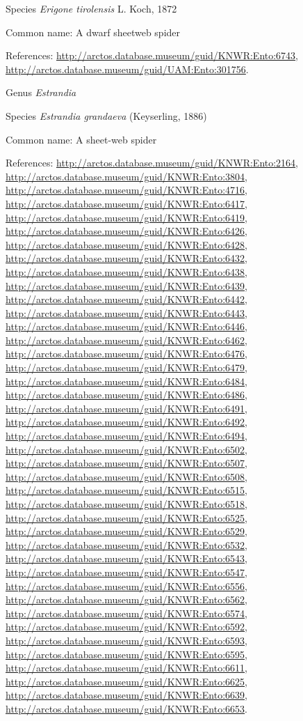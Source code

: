 \documentclass[9pt, article]{memoir}
\begin{document}
\begin{multicols}{2}
\vspace{6pt}\noindent\hspace{36pt}Species \textit{Erigone tirolensis} L. Koch, 1872


Common name: A dwarf sheetweb spider

References: 
\url{http://arctos.database.museum/guid/KNWR:Ento:6743}, 
\url{http://arctos.database.museum/guid/UAM:Ento:301756}.

\vspace{6pt}\noindent\hspace{30pt}Genus \textit{Estrandia}


\vspace{6pt}\noindent\hspace{36pt}Species \textit{Estrandia grandaeva} (Keyserling, 1886)


Common name: A sheet-web spider

References: 
\url{http://arctos.database.museum/guid/KNWR:Ento:2164}, 
\url{http://arctos.database.museum/guid/KNWR:Ento:3804}, 
\url{http://arctos.database.museum/guid/KNWR:Ento:4716}, 
\url{http://arctos.database.museum/guid/KNWR:Ento:6417}, 
\url{http://arctos.database.museum/guid/KNWR:Ento:6419}, 
\url{http://arctos.database.museum/guid/KNWR:Ento:6426}, 
\url{http://arctos.database.museum/guid/KNWR:Ento:6428}, 
\url{http://arctos.database.museum/guid/KNWR:Ento:6432}, 
\url{http://arctos.database.museum/guid/KNWR:Ento:6438}, 
\url{http://arctos.database.museum/guid/KNWR:Ento:6439}, 
\url{http://arctos.database.museum/guid/KNWR:Ento:6442}, 
\url{http://arctos.database.museum/guid/KNWR:Ento:6443}, 
\url{http://arctos.database.museum/guid/KNWR:Ento:6446}, 
\url{http://arctos.database.museum/guid/KNWR:Ento:6462}, 
\url{http://arctos.database.museum/guid/KNWR:Ento:6476}, 
\url{http://arctos.database.museum/guid/KNWR:Ento:6479}, 
\url{http://arctos.database.museum/guid/KNWR:Ento:6484}, 
\url{http://arctos.database.museum/guid/KNWR:Ento:6486}, 
\url{http://arctos.database.museum/guid/KNWR:Ento:6491}, 
\url{http://arctos.database.museum/guid/KNWR:Ento:6492}, 
\url{http://arctos.database.museum/guid/KNWR:Ento:6494}, 
\url{http://arctos.database.museum/guid/KNWR:Ento:6502}, 
\url{http://arctos.database.museum/guid/KNWR:Ento:6507}, 
\url{http://arctos.database.museum/guid/KNWR:Ento:6508}, 
\url{http://arctos.database.museum/guid/KNWR:Ento:6515}, 
\url{http://arctos.database.museum/guid/KNWR:Ento:6518}, 
\url{http://arctos.database.museum/guid/KNWR:Ento:6525}, 
\url{http://arctos.database.museum/guid/KNWR:Ento:6529}, 
\url{http://arctos.database.museum/guid/KNWR:Ento:6532}, 
\url{http://arctos.database.museum/guid/KNWR:Ento:6543}, 
\url{http://arctos.database.museum/guid/KNWR:Ento:6547}, 
\url{http://arctos.database.museum/guid/KNWR:Ento:6556}, 
\url{http://arctos.database.museum/guid/KNWR:Ento:6562}, 
\url{http://arctos.database.museum/guid/KNWR:Ento:6574}, 
\url{http://arctos.database.museum/guid/KNWR:Ento:6592}, 
\url{http://arctos.database.museum/guid/KNWR:Ento:6593}, 
\url{http://arctos.database.museum/guid/KNWR:Ento:6595}, 
\url{http://arctos.database.museum/guid/KNWR:Ento:6611}, 
\url{http://arctos.database.museum/guid/KNWR:Ento:6625}, 
\url{http://arctos.database.museum/guid/KNWR:Ento:6639}, 
\url{http://arctos.database.museum/guid/KNWR:Ento:6653}.


\end{multicols}
\end{document}
